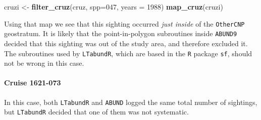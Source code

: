 \documentclass[
]{book}
\newenvironment{Shaded}{\begin{snugshade}}{\end{snugshade}}
\newcommand{\AttributeTok}[1]{\textcolor[rgb]{0.13,0.29,0.53}{#1}}
\newcommand{\DecValTok}[1]{\textcolor[rgb]{0.00,0.00,0.81}{#1}}
\newcommand{\FunctionTok}[1]{\textcolor[rgb]{0.13,0.29,0.53}{\textbf{#1}}}
\newcommand{\NormalTok}[1]{#1}
\newcommand{\OtherTok}[1]{\textcolor[rgb]{0.56,0.35,0.01}{#1}}
\newcommand{\StringTok}[1]{\textcolor[rgb]{0.31,0.60,0.02}{#1}}
\begin{document}
\begin{Shaded}
\begin{Highlighting}[]
\NormalTok{cruzi }\OtherTok{\textless{}{-}} \FunctionTok{filter\_cruz}\NormalTok{(cruz, }\AttributeTok{spp=}\StringTok{\textquotesingle{}047\textquotesingle{}}\NormalTok{, }\AttributeTok{years =} \DecValTok{1988}\NormalTok{)}
\FunctionTok{map\_cruz}\NormalTok{(cruzi)}
\end{Highlighting}
\end{Shaded}

Using that map we see that this sighting occurred \emph{just inside} of the \texttt{OtherCNP} geostratum. It is likely that the point-in-polygon subroutines inside \texttt{ABUND9} decided that this sighting was out of the study area, and therefore excluded it. The subroutines used by \texttt{LTabundR}, which are based in the \texttt{R} package \texttt{sf}, should not be wrong in this case.

\hypertarget{cruise-1621-073}{%
\paragraph*{Cruise 1621-073}\label{cruise-1621-073}}

In this case, both \texttt{LTabundR} and \texttt{ABUND} logged the same total number of sightings, but \texttt{LTabundR} decided that one of them was not systematic.
\end{document}
